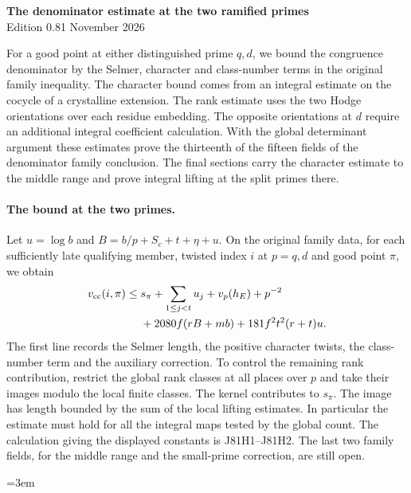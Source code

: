 \begin{center}
{\Large\bfseries The denominator estimate at the two ramified primes}\\[4pt]
Edition 0.81  November 2026
\end{center}

For a good point at either distinguished prime $q,d$, we bound the
congruence denominator by the Selmer, character and class-number
terms in the original family inequality. The character bound comes
from an integral estimate on the cocycle of a crystalline extension.
The rank estimate uses the two Hodge orientations over each residue
embedding. The opposite orientations at $d$ require an additional
integral coefficient calculation. With the global determinant
argument these estimates prove the thirteenth of the fifteen fields
of the denominator family conclusion. The final sections carry the
character estimate to the middle range and prove integral lifting at
the split primes there.

\paragraph*{The bound at the two primes.}
Let $u=\log b$ and $B=b/p+S_c+t+\eta+u$.
On the original family data, for each sufficiently late qualifying member,
twisted index $i$ at $p=q,d$ and good point $\pi$, we obtain
\[
\begin{aligned}
 v_{\rm cc}(i,\pi)\le {}&
 s_\pi+\sum_{1\le j<t} u_j+v_p(h_E)+p^{-2}\\
 &{}+2080 f(rB+mb)+181 f^2t^2(r+t)u .
\end{aligned}
\]
The first line records the Selmer length, the positive character twists,
the class-number term and the auxiliary correction. To control the
remaining rank contribution, restrict the global rank classes at all
places over $p$ and take their images modulo the local finite classes.
The kernel contributes to $s_\pi$. The image has length bounded by
the sum of the local lifting estimates. In particular the estimate
must hold for all the integral maps tested by the global count.
The calculation giving the displayed constants is J81H1--J81H2.
The last two family fields, for the middle range and the small-prime
correction, are still open.

\begingroup\emergencystretch=3em















\endgroup
